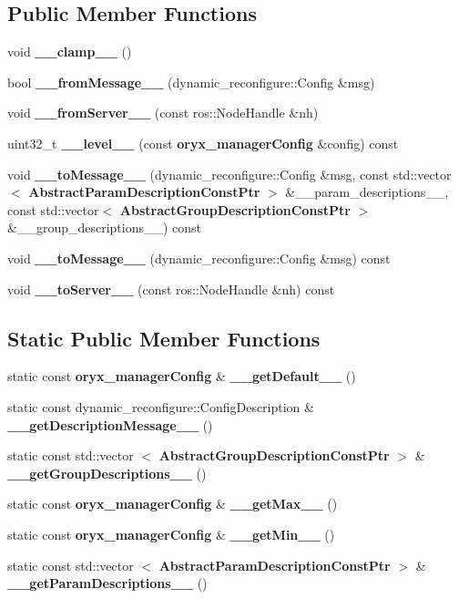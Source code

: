 \subsection*{\-Public \-Member \-Functions}
\begin{DoxyCompactItemize}
\item 
void {\bf \-\_\-\-\_\-clamp\-\_\-\-\_\-} ()
\item 
bool {\bf \-\_\-\-\_\-from\-Message\-\_\-\-\_\-} (dynamic\-\_\-reconfigure\-::\-Config \&msg)
\item 
void {\bf \-\_\-\-\_\-from\-Server\-\_\-\-\_\-} (const ros\-::\-Node\-Handle \&nh)
\item 
uint32\-\_\-t {\bf \-\_\-\-\_\-level\-\_\-\-\_\-} (const {\bf oryx\-\_\-manager\-Config} \&config) const 
\item 
void {\bf \-\_\-\-\_\-to\-Message\-\_\-\-\_\-} (dynamic\-\_\-reconfigure\-::\-Config \&msg, const std\-::vector$<$ {\bf \-Abstract\-Param\-Description\-Const\-Ptr} $>$ \&\-\_\-\-\_\-param\-\_\-descriptions\-\_\-\-\_\-, const std\-::vector$<$ {\bf \-Abstract\-Group\-Description\-Const\-Ptr} $>$ \&\-\_\-\-\_\-group\-\_\-descriptions\-\_\-\-\_\-) const 
\item 
void {\bf \-\_\-\-\_\-to\-Message\-\_\-\-\_\-} (dynamic\-\_\-reconfigure\-::\-Config \&msg) const 
\item 
void {\bf \-\_\-\-\_\-to\-Server\-\_\-\-\_\-} (const ros\-::\-Node\-Handle \&nh) const 
\end{DoxyCompactItemize}
\subsection*{\-Static \-Public \-Member \-Functions}
\begin{DoxyCompactItemize}
\item 
static const {\bf oryx\-\_\-manager\-Config} \& {\bf \-\_\-\-\_\-get\-Default\-\_\-\-\_\-} ()
\item 
static const \*
dynamic\-\_\-reconfigure\-::\-Config\-Description \& {\bf \-\_\-\-\_\-get\-Description\-Message\-\_\-\-\_\-} ()
\item 
static const std\-::vector\*
$<$ {\bf \-Abstract\-Group\-Description\-Const\-Ptr} $>$ \& {\bf \-\_\-\-\_\-get\-Group\-Descriptions\-\_\-\-\_\-} ()
\item 
static const {\bf oryx\-\_\-manager\-Config} \& {\bf \-\_\-\-\_\-get\-Max\-\_\-\-\_\-} ()
\item 
static const {\bf oryx\-\_\-manager\-Config} \& {\bf \-\_\-\-\_\-get\-Min\-\_\-\-\_\-} ()
\item 
static const std\-::vector\*
$<$ {\bf \-Abstract\-Param\-Description\-Const\-Ptr} $>$ \& {\bf \-\_\-\-\_\-get\-Param\-Descriptions\-\_\-\-\_\-} ()
\end{DoxyCompactItemize}
